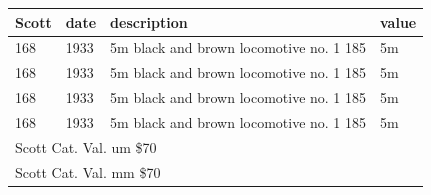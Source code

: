 \documentclass[justified]{tufte-book}
\begin{document}


\vspace{0pt}
\begin{tabular}{llp{3cm}l}
\toprule
Scott &date &description &value\\
\midrule
168   &1933 &5m black and brown locomotive no. 1 185 &5m\\
168   &1933 &5m black and brown locomotive no. 1 185 &5m\\
168   &1933 &5m black and brown locomotive no. 1 185 &5m\\
168   &1933 &5m black and brown locomotive no. 1 185 &5m\\
\midrule
\multicolumn{4}{l}{Scott Cat. Val. um \$70}\\
\multicolumn{4}{l}{Scott Cat. Val. mm \$70}\\
\bottomrule
\end{tabular}
\end{document}
